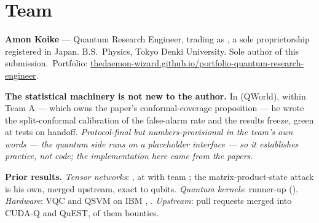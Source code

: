 \section{Team}

\textbf{Amon Koike} --- Quantum Research Engineer, trading as ,
a sole proprietorship registered in Japan. B.S.\ Physics, Tokyo Denki University.
Sole author of this submission.\ Portfolio:
\url{thedaemon-wizard.github.io/portfolio-quantum-research-engineer}.

\textbf{The statistical machinery is not new to the author.} In
 (QWorld), within Team A --- which owns the paper's
conformal-coverage proposition --- he wrote the split-conformal calibration of the false-alarm
rate and the results freeze, green at  tests on handoff. \emph{Protocol-final but
numbers-provisional in the team's own words --- the quantum side runs on a placeholder
interface --- so it establishes practice, not code; the implementation here came from the
papers.}

\textbf{Prior results.} \emph{Tensor networks}: ,
 at  with team ; the
matrix-product-state attack is his own, merged upstream, exact to  qubits. \emph{Quantum
kernels}:  runner-up (). \emph{Hardware}: VQC and
QSVM on IBM , . \emph{Upstream}:  pull requests
merged into CUDA-Q and QuEST,  of them  bounties.
